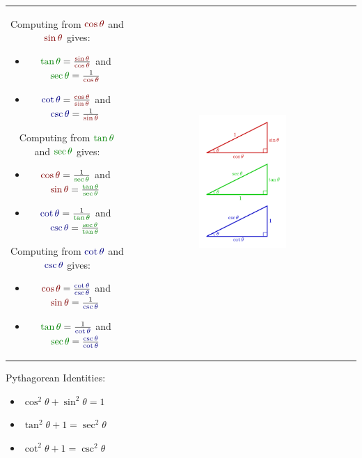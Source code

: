 \documentclass{article}
\newcommand{\dr}[1]{\textcolor{dark_red}{#1}}
\newcommand{\dg}[1]{\textcolor{dark_green}{#1}}
\newcommand{\db}[1]{\textcolor{dark_blue}{#1}}
\begin{document}
\begin{tabular}{cc}
\parbox{0.5\textwidth}{
Computing from \(\dr{\cos\theta}\) and \(\dr{\sin\theta}\) gives:
\begin{itemize}
\item \(\dg{\tan\theta} = \frac{\dr{\sin\theta}}{\dr{\cos\theta}}\) and \(\dg{\sec\theta} = \frac{1}{\dr{\cos\theta}}\)
\item \(\db{\cot\theta} = \frac{\dr{\cos\theta}}{\dr{\sin\theta}}\) and \(\db{\csc\theta} = \frac{1}{\dr{\sin\theta}}\)
\end{itemize}
Computing from \(\dg{\tan\theta}\) and \(\dg{\sec\theta}\) gives:
\begin{itemize}
\item \(\dr{\cos\theta} = \frac{1}{\dg{\sec\theta}}\) and \(\dr{\sin\theta} = \frac{\dg{\tan\theta}}{\dg{\sec\theta}}\)
\item \(\db{\cot\theta} = \frac{1}{\dg{\tan\theta}}\) and \(\db{\csc\theta} = \frac{\dg{\sec\theta}}{\dg{\tan\theta}}\)
\end{itemize}
Computing from \(\db{\cot\theta}\) and \(\db{\csc\theta}\) gives:
\begin{itemize}
\item \(\dr{\cos\theta} = \frac{\db{\cot\theta}}{\db{\csc\theta}}\) and \(\dr{\sin\theta} = \frac{1}{\db{\csc\theta}}\)
\item \(\dg{\tan\theta} = \frac{1}{\db{\cot\theta}}\) and \(\dg{\sec\theta} = \frac{\db{\csc\theta}}{\db{\cot\theta}}\)
\end{itemize}} & \parbox{0.5\textwidth}{
\includegraphics[width = 0.4\textwidth]{3_triangles}
}
\end{tabular}

Pythagorean Identities:
\begin{itemize}
\item \dr{\(\cos^2\theta + \sin^2\theta = 1\)}
\item \dg{\(\tan^2\theta + 1 = \sec^2\theta\)}
\item \db{\(\cot^2\theta + 1 = \csc^2\theta\)}
\end{itemize}
\end{document}
